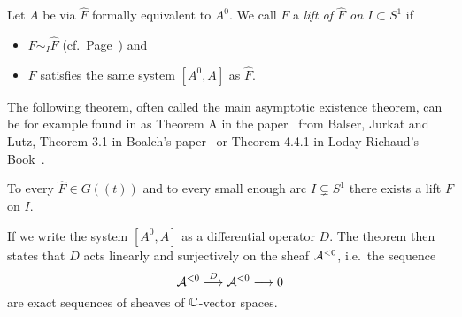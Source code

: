 \begin{defn}\label{defn:lift}
  Let $A$ be via $\hat F$ formally equivalent to $A^0$.
  We call $F$ a \emph{lift of $\hat F$ on $I\subset S^1$} if
  \begin{itemize}
    \item $F\sim_I\hat F$
      (cf.\ Page~\pageref{page:notationForAsymptoticExpansion}) and
    \item $F$ satisfies the same system $[A^0,A]$ as $\hat F$.
  \end{itemize}
\end{defn}
The following theorem, often called the main asymptotic existence theorem, can
be for example found in as Theorem A in the paper~\cite{BJL1979Birkhoff} from
Balser, Jurkat and Lutz, Theorem 3.1 in Boalch's paper~\cite[Thm.3.1]{boalch}
or Theorem 4.4.1 in Loday-Richaud's Book~\cite{Loday2014}.
\begin{thm}[M.A.E.T]\label{thm:maet}
  To every $\hat F\in G(\!(t)\!)$ and to every small enough arc
  $I\subsetneq S^1$ there exists a lift $F$ on $I$.
  \begin{s-rem}
    If we write the system $[A^0,A]$ as a differential operator $D$.
    The theorem then states that $D$ acts linearly and surjectively on the
    sheaf $\mathcal{A}^{<0}$, i.e.\ the sequence
    \[
      \mathcal{A}^{<0}\overset{D}\longrightarrow\mathcal{A}^{<0} \longrightarrow 0
    \]
    are exact sequences of sheaves of $\mathbb{C}$-vector spaces.
    \begin{comment}
      (cf.~\cite[App.1;Thm.1]{malgrange1991})
    \end{comment}
  \end{s-rem}
\end{thm}
\begin{comment}
  \PROBLEM[Think about it?]
  In the language of meromorphic connections is this theorem sometimes called
  \emph{sectorial decomposition} and stated for example
  in~\cite[Thm.II.5.12]{sabbah2007isomonodromic}
  and~\cite[Sec.II.2.4]{sabbah_cimpa90}.
\end{comment}
\begin{comment}
  \begin{thm}[Sectorial decomposition]
    \PROBLEM[needs more defns]
    Let $(\cM,\nabla)$ be a meromorphic connection and let
    $\hat\lambda:\hat\cM\to\hat\cM^{nf}$ be the isomorphism given by
    theorem~\ref{thm:leveltTurittin} together with the model $\cM^{nf}$.
    There exists then, for any $e^{i\theta^0}\in S^1$, an isomorphism
    $\tilde\lambda_{\theta^0}:
    \tilde\cM_{\theta^0}=\cA_{\theta^0}\otimes\cM\to\tilde\cM_{\theta^0}^{nf}$
    lifting $\hat\lambda$ \rewrite{that is, such that} the following diagram
    \[ \begin{tikzcd}
        \tilde\cM_{\theta^o} \dar \rar{\tilde\lambda_{\theta^o}} &
        \tilde\cM^{nf}_{\theta^o} \dar
        \\\hat\cM \rar{\hat\lambda} &
        \hat\cM^{nf}
    \end{tikzcd} \]
    commutes
  \end{thm}
\end{comment}

